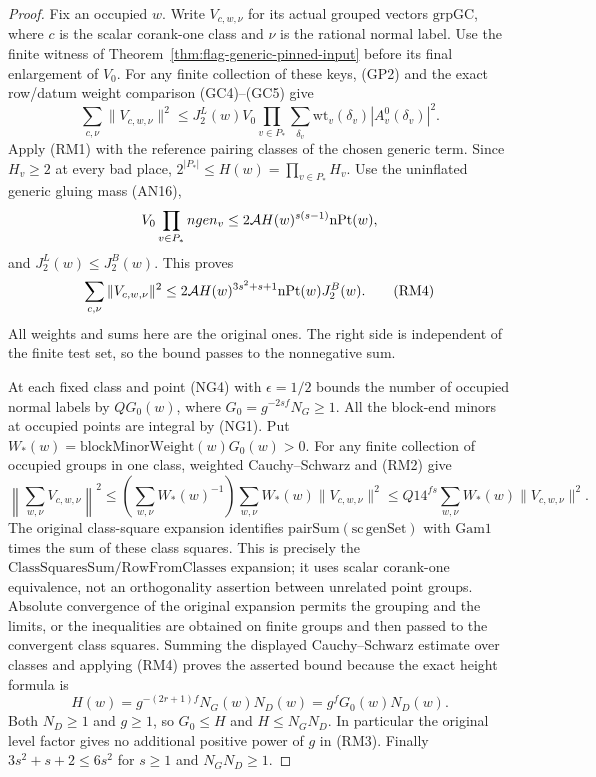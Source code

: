 \begin{proof}
Fix an occupied \(w\). Write \(V_{c,w,\nu}\)
for its actual grouped vectors \(\mathrm{grpGC}\), where
\(c\) is the scalar corank-one class and \(\nu\) is the
rational normal label. Use the finite witness of
Theorem~\ref{thm:flag-generic-pinned-input}
before its final enlargement of \(V_0\).
For any finite collection of these keys, (GP2) and
the exact row/datum weight comparison (GC4)--(GC5)
give
\[
 \sum_{c,\nu}\|V_{c,w,\nu}\|^2
 \le J_2^L(w) V_0
       \prod_{v\in P_*}
         \sum_{\delta_v}\mathrm{wt}_v(\delta_v)
                                  |A_v^0(\delta_v)|^2 .
\]
Apply (RM1) with the reference pairing classes of the
chosen generic term. Since \(H_v\ge2\) at every bad
place, \(2^{|P_*|}\le H(w)=\prod_{v\in P_*}H_v\).
Use the uninflated generic gluing mass (AN16),
\[
  V_0\prod_{v\in P_*}ngen_v
     \le 2{\cal A} H(w)^{s(s-1)}\mathrm{nPt}(w),
\]
and \(J_2^L(w)\le J_2^B(w)\). This proves
\[
 \sum_{c,\nu}\|V_{c,w,\nu}\|^2
 \le 2{\cal A} H(w)^{3s^2+s+1}
                       \mathrm{nPt}(w)J_2^B(w).        \tag{RM4}
\]
All weights and sums here are the original ones.
The right side is independent of the finite test
set, so the bound passes to the nonnegative sum.

At each fixed class and point (NG4) with \(\epsilon=1/2\)
bounds the number of occupied normal labels by
\(QG_0(w)\), where \(G_0=g^{-2sf}N_G\ge1\).
All the block-end minors at occupied points are integral
by (NG1). Put
\(W_*(w)=\mathrm{blockMinorWeight}(w)G_0(w)>0\).
For any finite collection of occupied groups in one
class, weighted Cauchy--Schwarz and (RM2) give
\[
 \left\|\sum_{w,\nu} V_{c,w,\nu}\right\|^2
 \le \left(\sum_{w,\nu} W_*(w)^{-1}\right)
       \sum_{w,\nu}W_*(w)\|V_{c,w,\nu}\|^2
 \le Q14^{fs}\sum_{w,\nu}W_*(w)\|V_{c,w,\nu}\|^2 .
\]
The original class-square expansion identifies
\(\mathrm{pairSum}(\mathrm{sc}\,\mathrm{genSet})\)
with \(\mathrm{Gam1}\) times the sum of these
class squares. This is precisely the
\(\mathrm{ClassSquaresSum}/\mathrm{RowFromClasses}\)
expansion; it uses scalar corank-one equivalence,
not an orthogonality assertion between unrelated
point groups. Absolute convergence of the original
expansion permits the grouping and the limits,
or the inequalities are obtained on finite groups
and then passed to the convergent class squares.
Summing the displayed Cauchy--Schwarz estimate over
classes and applying (RM4) proves the asserted bound
because the exact height formula is
\[
 H(w)=g^{-(2r+1)f}N_G(w)N_D(w)
       =g^fG_0(w)N_D(w).
\]
Both \(N_D\ge1\) and \(g\ge1\), so \(G_0\le H\)
and \(H\le N_GN_D\). In particular the original level
factor gives no additional positive power of \(g\)
in (RM3). Finally \(3s^2+s+2\le6s^2\) for \(s\ge1\)
and \(N_GN_D\ge1\).
\end{proof}

